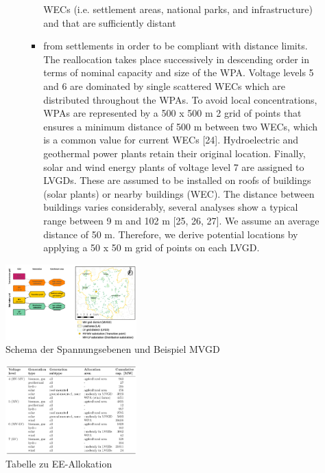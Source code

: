 \documentclass[
a4paper,     %
12pt         %
]{scrartcl}  %
\begin{document}
\begin{itemize}
\begin{itemize}
\begin{itemize}
\begin{itemize}
				WECs (i.e. settlement areas, national parks, and infrastructure) and that are sufficiently distant
				\item from settlements in order to be compliant with distance limits. The reallocation takes place
				successively in descending order in terms of nominal capacity and size of the WPA. Voltage
				levels 5 and 6 are dominated by single scattered WECs which are distributed throughout the
				WPAs. To avoid local concentrations, WPAs are represented by a 500 x 500 m 2 grid of points
				that ensures a minimum distance of 500 m between two WECs, which is a common value for
				current WECs [24]. Hydroelectric and geothermal power plants retain their original location.
				Finally, solar and wind energy plants of voltage level 7 are assigned to LVGDs. These are
				assumed to be installed on roofs of buildings (solar plants) or nearby buildings (WEC). The
				distance between buildings varies considerably, several analyses show a typical range between
				9 m and 102 m [25, 26, 27]. We assume an average distance of 50 m. Therefore, we derive
				potential locations by applying a 50 x 50 m grid of points on each LVGD.
			\end{itemize}
		\end{itemize}
	\end{itemize}
\end{itemize}


\begin{figure}[H]
	\label{MVGD-struct1}
	\includegraphics[width=0.45\textwidth]{Abb/sc_MVGD-structure1.png}
	\caption{Schema der Spannungsebenen und Beispiel MVGD}
\end{figure}

\begin{figure}[H]
	\label{EE-alloc}
	\caption{Tabelle zu EE-Allokation}
	\includegraphics[width=0.45\textwidth]{Abb/sc_EE-alloc.png}

\end{figure}
\end{document}
